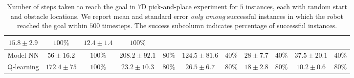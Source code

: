\begin{table}[t]
{\begin{tabular}{|c|c|c|c|c|c|c|c|c|c|c|}
                                                                   $15.8\pm
                                                                   2.9$
                                                                        &
                                                                          $100\%$
                                         & $12.4 \pm 1.4$ & $100\%$\\
    \hline
    Model NN & $56 \pm 16.2$ & $100\%$& $208.2 \pm 92.1$ & $80\%$ & $124.5 \pm
                                                     81.6$ & $40\%$ & $28
                                                                  \pm
                                                                  7.7$
                                                                      &
                                                                        $40\%$
                                         & $37.5 \pm 20.1$ & $40\%$\\
    \hline
    Q-learning & $172.4\pm 75$ & $100\%$& $23.2\pm 10.3$ & $80\%$ & $26.5 \pm
                                                           6.7$ & $80\%$ &
                                         $18 \pm 2.8$ & $80\%$& $10.2
                                                                \pm
                                                                0.6$ &
                                                                       $80\%$ \\
    \hline
  \end{tabular}}
  \caption{Number of steps taken to reach the goal in $7$D
    pick-and-place experiment for $5$ instances, each with random start
    and obstacle locations. We report mean
    and standard error \textit{only among}
    successful instances in which the robot reached the goal within $500$
    timesteps. The success subcolumn indicates percentage of
    successful instances.}
  \label{tab:pick-and-place}
\end{table}

